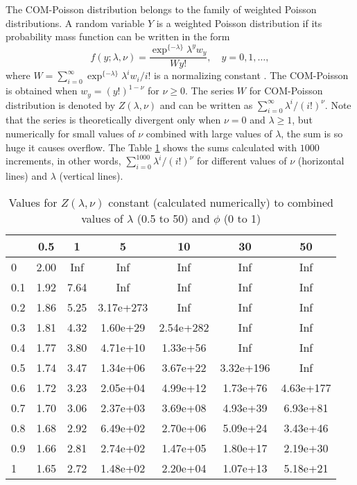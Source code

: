 \documentclass[9pt,a5paper,]{book}
\theoremstyle{definition}
\theoremstyle{definition}
\theoremstyle{remark}
\begin{document}
The COM-Poisson distribution belongs to the family of weighted Poisson
distributions. A random variable \(Y\) is a weighted Poisson
distribution if its probability mass function can be written in the form
\[
f(y; \lambda, \nu) = \frac{\exp^{\{-\lambda\}} \lambda^y w_y}{W y!},
\quad y = 0, 1, \ldots,
\] where
\(W = \sum_{i = 0}^{\infty} \exp^{\{-\lambda\}} \lambda^i w_i / i!\) is
a normalizing constant \citep{Sellers2012}. The COM-Poisson is obtained
when \(w_{y} = (y!)^{1-\nu}\) for \(\nu \geq 0\). The series \(W\) for
COM-Poisson distribution is denoted by \(Z(\lambda, \nu)\) and can be
written as \(\sum_{i=0}^{\infty}\lambda^i/(i!)^\nu\). Note that the
series is theoretically divergent only when \(\nu = 0\) and
\(\lambda \geq 1\), but numerically for small values of \(\nu\) combined
with large values of \(\lambda\), the sum is so huge it causes overflow.
The Table \ref{tab:convergenceZ} shows the sums calculated with \(1000\)
increments, in other words, \(\sum_{i=0}^{1000}\lambda^i/(i!)^\nu\) for
different values of \(\nu\) (horizontal lines) and \(\lambda\) (vertical
lines).

\begin{table}

\caption{\label{tab:convergenceZ}Values for $Z(\lambda, \nu)$ constant (calculated numerically) to combined values of $\lambda$ (0.5 to 50) and $\phi$ (0 to 1)}
\centering
\begin{tabular}[t]{lcccccc}
\toprule
  & 0.5 & 1 & 5 & 10 & 30 & 50\\
\midrule
0 & 2.00 & Inf & Inf & Inf & Inf & Inf\\
0.1 & 1.92 & 7.64 & Inf & Inf & Inf & Inf\\
0.2 & 1.86 & 5.25 & 3.17e+273 & Inf & Inf & Inf\\
0.3 & 1.81 & 4.32 & 1.60e+29 & 2.54e+282 & Inf & Inf\\
0.4 & 1.77 & 3.80 & 4.71e+10 & 1.33e+56 & Inf & Inf\\
0.5 & 1.74 & 3.47 & 1.34e+06 & 3.67e+22 & 3.32e+196 & Inf\\
0.6 & 1.72 & 3.23 & 2.05e+04 & 4.99e+12 & 1.73e+76 & 4.63e+177\\
0.7 & 1.70 & 3.06 & 2.37e+03 & 3.69e+08 & 4.93e+39 & 6.93e+81\\
0.8 & 1.68 & 2.92 & 6.49e+02 & 2.70e+06 & 5.09e+24 & 3.43e+46\\
0.9 & 1.66 & 2.81 & 2.74e+02 & 1.47e+05 & 1.80e+17 & 2.19e+30\\
1 & 1.65 & 2.72 & 1.48e+02 & 2.20e+04 & 1.07e+13 & 5.18e+21\\
\bottomrule
\end{tabular}
\end{table}
\end{document}
